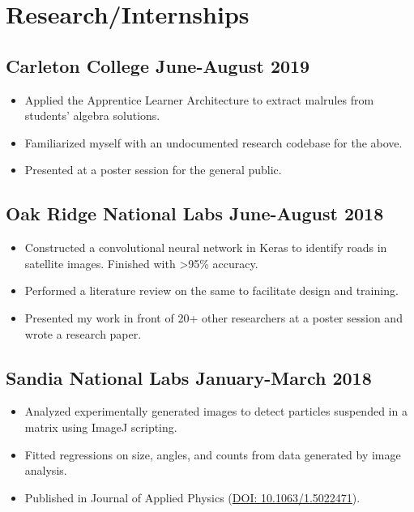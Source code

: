\documentclass[12pt]{article}
\begin{document}
{\begin{itemize}
\end{itemize}

\section*{Research/Internships}

\subsection*{\indent Carleton College \hfill June-August 2019}
\begin{itemize}
\item Applied the Apprentice Learner Architecture to extract malrules from students' algebra solutions.
\item Familiarized myself with an undocumented research codebase for the above.
\item Presented at a poster session for the general public.
\end{itemize}

\subsection*{\indent Oak Ridge National Labs \hfill June-August 2018}
\begin{itemize}
\item
  Constructed a convolutional neural network in Keras to identify roads
  in satellite images. Finished
  with \textgreater{}95\% accuracy.

  
 \item Performed a literature review on the same to facilitate design and training.

  \item Presented my work in front of 20+ other researchers at a poster session and wrote a research paper.
\end{itemize}

\subsection*{Sandia National Labs \hfill January-March 2018}
\begin{itemize}
\item
  Analyzed experimentally generated images to detect particles suspended in a matrix using ImageJ scripting.
\item
  Fitted regressions on size, angles, and counts from data generated by
  image analysis.
\item
  Published in Journal of Applied Physics (\href{https://aip.scitation.org/doi/10.1063/1.5022471}{DOI: 10.1063/1.5022471}).
\end{itemize}




}
\end{document}
